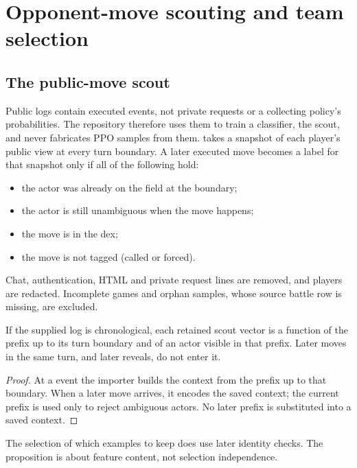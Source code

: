 \section{Opponent-move scouting and team selection}
\label{sec:scout}

\historyscope

\subsection{The public-move scout}
Public logs contain executed events, not private requests or a collecting
policy's probabilities. The repository therefore uses them to train a
classifier, the scout, and never fabricates PPO samples from them.
 takes a snapshot of each player's public view at every
turn boundary. A later executed move becomes a label for that snapshot only
if all of the following hold:
\begin{itemize}
  \item the actor was already on the field at the boundary;
  \item the actor is still unambiguous when the move happens;
  \item the move is in the dex;
  \item the move is not tagged \code{[from]} (called or forced).
\end{itemize}
Chat, authentication, HTML and private request lines are removed, and players
are redacted. Incomplete games and orphan samples, whose source battle row is
missing, are excluded.

\begin{proposition}
\label{prop:scout}
If the supplied log is chronological, each retained scout vector is a
function of the prefix up to its turn boundary and of an actor visible in that
prefix. Later moves in the same turn, and later reveals, do not enter it.
\end{proposition}
\begin{proof}
At a  event the importer builds the context from the prefix up to
that boundary. When a later move arrives, it encodes the saved context; the
current prefix is used only to reject ambiguous actors. No later prefix is
substituted into a saved context.
\end{proof}
The selection of which examples to keep does use later identity checks. The
proposition is about feature content, not selection independence.

